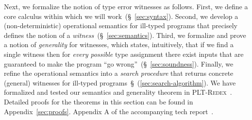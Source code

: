 %
%
%


Next, we formalize the notion of type error witnesses as follows.
%
First, we define a core calculus within which we will work~(\S~\ref{sec:syntax}).
%
Second, we develop a (non-deterministic) operational semantics
for ill-typed programs that precisely defines the notion
of a \emph{witness}~(\S~\ref{sec:semantics}).
%
Third, we formalize and prove a notion of \emph{generality} for
witnesses, which states, intuitively, that if we find a
single witness then for \emph{every possible} type
assignment there exist inputs that are guaranteed to make
the program ``go wrong''~(\S~\ref{sec:soundness}).
%
Finally, we refine the operational semantics into a
\emph{search procedure} that returns concrete (general)
witnesses for ill-typed programs~\S~(\ref{sec:search-algorithm}).
%
We have formalized and tested our semantics and generality theorem
in \textsc{PLT-Redex}~\cite{Felleisen2009-ya}.
%
Detailed proofs for the theorems in this section can be found in
%
{Appendix~\ref{sec:proofs}.}
{Appendix A of the accompanying tech report~\cite{Seidel2016Dynamic-TechRep}.}


